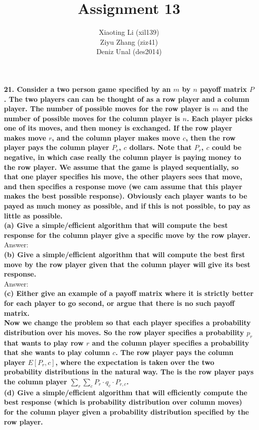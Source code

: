 \documentclass{article}
\title{Assignment 13}
\author{Xiaoting Li (xil139) \\
Ziyu Zhang (ziz41) \\
Deniz Unal (des2014)}
\date{}
\begin{document}
\noindent
\textbf{21. Consider a two person game specified by an $m$ by $n$ payoff matrix $P$. The two players can can be thought of as a row player and a column player. The number of possible moves for the row player is $m$ and the number of possible moves for the column player is $n$. Each player picks one of its moves, and then money is exchanged. If the row player makes move $r$, and the column player makes move $c$, then the row player pays the column player $P_r$, $c$ dollars. Note that $P_r$, $c$ could be negative, in which case really the column player is paying money to the row player. We assume that the game is played sequentially, so that one player specifies his move, the other players sees that move, and then specifies a response move (we cam assume that this player makes the best possible response). Obviously each player wants to be payed as much money as possible, and if this is not possible, to pay as little as possible.} \\ \newline
\textbf{(a) Give a simple/efficient algorithm that will compute the best response for the column player give a specific move by the row player.} \\ \newline
Answer: \\ \newline
\textbf{(b) Give a simple/efficient algorithm that will compute the best first move by the row player given that the column player will give its best response.} \\ \newline
Answer: \\ \newline
\textbf{(c) Either give an example of a payoff matrix where it is strictly better for each player to go second, or argue that there is no such payoff matrix.} \\ \newline
\textbf{Now we change the problem so that each player specifies a probability distribution over his moves. So the row player specifies a probability $p_r$ that wants to play row $r$ and the column player specifies a probability  that she wants to play column $c$. The row player pays the column player $E[P_r,c]$, where the expectation is taken over the two probability distributions in the natural way. The is the row player pays the column player $\sum_r\sum_c P_r \cdot q_c \cdot P_{r,c}$.} \\ \newline
\textbf{(d) Give a simple/efficient algorithm that will efficiently compute the best response (which is probability distribution over column moves) for the column player given a probability distribution specified by the row player.} \\ \newline
\end{document}

